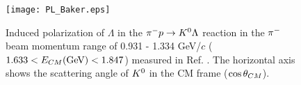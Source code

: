 \begin{comment}
We requested a 34-day beam time, including a 29-day production run and 5-day commissioning and calibration runs, as the first stage to measure the differential cross-sections and the analyzing power by accumulating 50 M momentum-tagged beam $\Lambda$s. We also requested an additional 34-day beam time as the second stage, including the production, commissioning, and calibration runs with the same ratio to measure the depolarization and improve the differential cross-section accuracy and analyzing power measurements. Since the momentum dependence of the differential cross-section is expected to become large toward the $\SN$ threshold range \cite{Miwa-LpProp}, the differential cross-section will be measured with the beam $\Lambda$ momentum step of $dp_{\Lambda}=50$ MeV/$c$. The analyzing power and depolarization will be measured with the beam $\Lambda$ momentum step of $dp_{\Lambda}=100$ MeV/$c$. 
\end{comment}


\begin{figure}[!h]
  \begin{center}
   \texttt{[image: PL\_Baker.eps]}
   \caption{Induced polarization of $\Lambda$ in the $\pi^- p \to K^0 \Lambda$ reaction in the $\pi^{-}$ beam momentum range of 0.931 - 1.334 GeV/$c$ ($1.633<E_{CM} {\rm (GeV)}<1.847$) measured in Ref. \cite{Baker}. The horizontal axis shows the scattering angle of $K^{0}$ in the CM frame ($\cos{\theta}_{CM}$).}
   \label{fig-PL_Baker}
 \end{center}
\end{figure}

\begin{comment}
\begin{figure}[!h]
  \begin{center}
   \texttt{[image: E86setup.png]}
   \caption{Experimental setup of the J-PARC E86 \cite{Miwa-LpProp}. To accurately measure the beam timing and momentum, beam timing hodoscope BH1 and beam fiber tracker BFT-U will be installed upstream of the D magnet, and BFT-D and BH2 will be installed downstream of the magnet. To measure the beam position at the LH$_{2}$ target, VFT will be installed just upstream of the target.}
   \label{fig-E86setup}
 \end{center}
\end{figure}
\end{comment}

%
